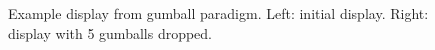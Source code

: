 \documentclass[10pt,letterpaper]{article}
\begin{document}
\begin{figure}
\centering
{}
\caption{Example display from gumball paradigm. Left: initial display. Right: display with 5 gumballs dropped.  \label{fig:gumball-paradigm}}
\end{figure}
\end{document}
